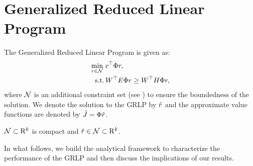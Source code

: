 \section{Generalized Reduced Linear Program}
The Generalized Reduced Linear Program is given as:
\begin{align}\label{grlp}
\begin{split}
\underset{r\in \N}{\min}\, &\, c^\top \Phi r,\\
\text{s.t.}\mb & \,W^\top E\Phi r\geq W^\top H \Phi r,
\end{split}
\end{align}
where $\mathcal{N}$ is an additional constraint set (see ) to ensure the boundedness of the solution. We denote the solution to the GRLP by $\hat{r}$ and the approximate value functions are denoted by $\hat{J}=\Phi \hat{r}$. 
\begin{assumption}\label{nassmp}
$\mathcal{N}\subset \mathrm{R}^k$ is compact and $\tilde{r} \in \mathcal{N}\subset\mathrm{R}^k$.
\end{assumption}
In what follows, we build the analytical framework to characterize the performance of the GRLP and then discuss the implications of our results.
